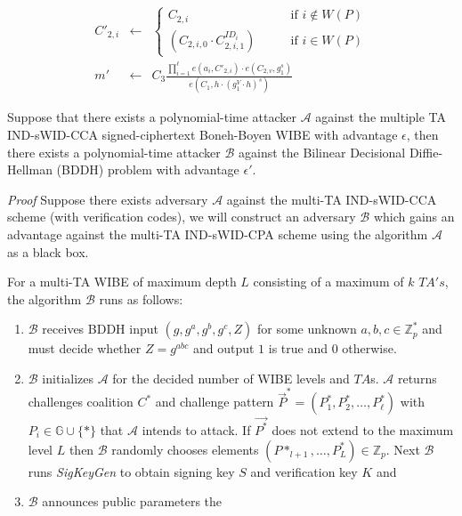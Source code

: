 \documentclass[10pt]{llncs}
\newcommand{\A}{\mathcal{A}}
\newcommand{\B}{\mathcal{B}}
\newcommand{\Zbb}{\mathbb{Z}}
\newcommand{\Gbb}{\mathbb{G}}
\newcommand{\ID}{\mathit{ID}}
\newcommand{\TA}{\mathit{TA}}
\begin{document}
\begin{itemize}
	\begin{eqnarray*}
		C'_{2,i} & \gets & \left\{
			\begin{array}{ll}
				C_{2,i} & \qquad \mbox{if } i \notin W(P) \\
				(C_{2,i,0} \cdot C_{2,i,1}^{\ID_i}) & \qquad \mbox{if } i \in W(P)
			\end{array}
			\right. \\
			m' & \gets & C_{3} \frac{\prod_{i=1}^{\ell} e(a_{i},C'_{2,i}) \cdot e(C_{2,v}, g_1^s)}{e(C_{1},h \cdot (g_1^V \cdot h)^s)}
	\end{eqnarray*}
\end{itemize}

\begin{theorem}
Suppose that there exists a polynomial-time attacker $\A$ against the multiple TA IND-sWID-CCA signed-ciphertext Boneh-Boyen WIBE with advantage $\epsilon$, then there exists a polynomial-time attacker $\B$ against the Bilinear Decisional Diffie-Hellman (BDDH) problem with advantage $\epsilon'$.
\end{theorem}
\emph{Proof} Suppose there exists adversary $\A$ against the multi-TA IND-sWID-CCA scheme (with verification codes), we will construct an adversary $\B$ which gains an advantage against the multi-TA IND-sWID-CPA scheme using the algorithm $\A$ as a black box.

For a multi-TA WIBE of maximum depth $L$ consisting of a maximum of $k$ $\TA's$, the algorithm $\B$ runs as follows:

\begin{enumerate}
	\item $\B$ receives BDDH input $(g, g^a, g^b, g^c, Z)$ for some unknown $a, b, c \in \Zbb_p^*$ and must decide whether $Z = g^{abc}$ and output $1$ is true and $0$ otherwise.
	\item $\B$ initializes $\A$ for the decided number of WIBE levels and $\TA$s. $\A$ returns challenges coalition $C^*$ and challenge pattern $\vec{P}^* = (P^*_1, P^*_2, \ldots, P^*_\ell)$ with $P_{i} \in \Gbb \cup \{*\}$ that $\A$ intends to attack. If $\vec{P^*}$ does not extend to the maximum level $L$ then $\B$ randomly chooses elements $(P*_{l+1}, \dots, P^*_{L}) \in \Zbb_p$. Next $\B$ runs \emph{SigKeyGen} to obtain signing key $S$ and verification key $K$ and 
	\item $\B$ announces public parameters the 
\end{enumerate}
\end{document}
